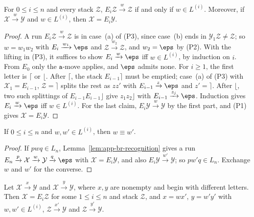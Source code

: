 \begin{lemma}\label{lem:app-br-recognition}
For $0\le i\le n$ and every stack $\mathcal Z$,
$E_i\mathcal Z\xrightarrow{w}\mathcal Z$ if and only if $w\in L^{(i)}$. Moreover, if
$\mathcal X\xrightarrow{w}\mathcal Y$ and $w\in L^{(i)}$, then $\mathcal X=E_i\mathcal Y$.
\end{lemma}

\begin{proof}
A run $E_i\mathcal Z\xrightarrow{w}\mathcal Z$ is in case~(a) of (P3), since case~(b)
ends in $\mathcal Y_1\mathcal Z\ne\mathcal Z$; so $w=w_1w_2$ with
$E_i\xrightarrow{w_1}\eps$ and $\mathcal Z\xrightarrow{w_2}\mathcal Z$, and
$w_2=\eps$ by (P2). With the lifting in (P3), it suffices to show
$E_i\xrightarrow{w}\eps$ iff $w\in L^{(i)}$, by induction on $i$. From
$E_0$ only the $\mathtt a$-move applies, and $\eps$ admits none. For
$i\ge1$, the first letter is $\lceil$ or $\lfloor$. After $\lceil$, the
stack $E_{i-1}\rceil$ must be emptied; case~(a) of (P3) with
$\mathcal X_1=E_{i-1}$, $\mathcal Z=\rceil$ splits the rest as $zz'$ with
$E_{i-1}\xrightarrow{z}\eps$ and $z'=\rceil$. After $\lfloor$, two such
splittings of $E_{i-1}E_{i-1}\rfloor$ give $z_1z_2\rfloor$ with
$E_{i-1}\xrightarrow{z_j}\eps$. Induction gives
$E_i\xrightarrow{w}\eps$ iff $w\in L^{(i)}$. For the last claim,
$E_i\mathcal Y\xrightarrow{w}\mathcal Y$ by the first part, and (P1) gives
$\mathcal X=E_i\mathcal Y$.
\end{proof}

\begin{lemma}\label{lem:app-br-exchange}
If $0\le i\le n$ and $w,w'\in L^{(i)}$, then $w\equiv w'$.
\end{lemma}

\begin{proof}
If $pwq\in L_n$, Lemma~\ref{lem:app-br-recognition} gives a run
$E_n\xrightarrow{p}\mathcal X\xrightarrow{w}\mathcal Y\xrightarrow{q}\eps$ with
$\mathcal X=E_i\mathcal Y$, and also $E_i\mathcal Y\xrightarrow{w'}\mathcal Y$; so
$pw'q\in L_n$. Exchange $w$ and $w'$ for the converse.
\end{proof}

\begin{lemma}\label{lem:app-br-branch}
Let $\mathcal X\xrightarrow{x}\mathcal Y$ and $\mathcal X\xrightarrow{y}\mathcal Y$, where
$x,y$ are nonempty and begin with different letters. Then
$\mathcal X=E_i\mathcal Z$ for some $1\le i\le n$ and stack $\mathcal Z$, and $x=wx'$,
$y=w'y'$ with $w,w'\in L^{(i)}$, $\mathcal Z\xrightarrow{x'}\mathcal Y$ and
$\mathcal Z\xrightarrow{y'}\mathcal Y$.
\end{lemma}

